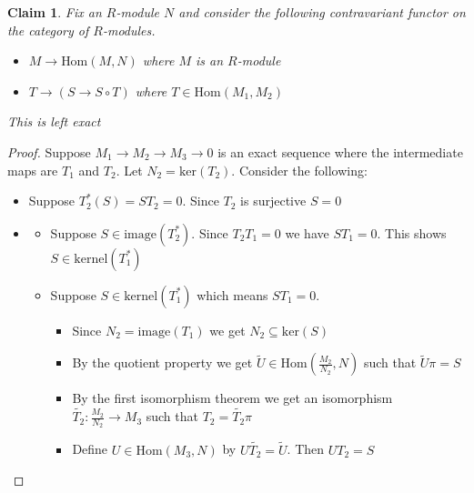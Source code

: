 \documentclass[a4paper,11pt]{article}
\newtheorem{claim}{Claim}
\begin{document}
\begin{claim}
  Fix an $R$-module $N$ and consider the following contravariant functor on the category of $R$-modules.
  \begin{itemize}
    \item $M \to \text{Hom}(M,N)$ where $M$ is an $R$-module
    \item $T \to (S \to S \circ T)$ where $T \in \text{Hom}(M_1,M_2)$
  \end{itemize}
  This is left exact 
\end{claim}

\begin{proof}
  Suppose $M_1 \to M_2 \to M_3 \to 0$ is an exact sequence where the intermediate maps are $T_1$ and $T_2$. Let $N_2=\text{ker}(T_2)$. Consider the following:
  \begin{itemize}
    \item Suppose $T_2^*(S)=ST_2=0$. Since $T_2$ is surjective $S=0$
    \item 
    \begin{itemize}
      \item Suppose $S \in \text{image}(T_2^*)$. Since $T_2T_1=0$ we have $ST_1=0$. This shows $S \in \text{kernel}(T_1^*)$
      \item Suppose $S \in \text{kernel}(T_1^*)$ which means $ST_1=0$. 
            \begin{itemize}
              \item Since $N_2 = \text{image}(T_1)$ we get $N_2 \subseteq \text{ker}(S)$
              \item By the quotient property we get $\widetilde{U} \in \text{Hom}(\frac{M_2}{N_2},N)$ such that $\widetilde{U}\pi=S$
              \item By the first isomorphism theorem we get an isomorphism $\widetilde{T_2}:\frac{M_2}{N_2} \to M_3$ such that $T_2 = \widetilde{T_2}\pi$
              \item Define $U \in \text{Hom}(M_3,N)$ by $U\widetilde{T_2}=\widetilde{U}$. Then $UT_2=S$
            \end{itemize}
    \end{itemize}
  \end{itemize}
\end{proof}
\end{document}

